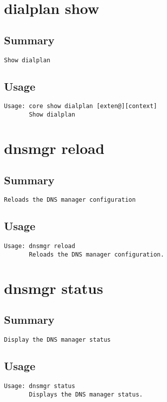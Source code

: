 \section{dialplan show}
\subsection{Summary}
\begin{verbatim}
Show dialplan
\end{verbatim}
\subsection{Usage}
\begin{verbatim}
Usage: core show dialplan [exten@][context]
       Show dialplan

\end{verbatim}


\section{dnsmgr reload}
\subsection{Summary}
\begin{verbatim}
Reloads the DNS manager configuration
\end{verbatim}
\subsection{Usage}
\begin{verbatim}
Usage: dnsmgr reload
       Reloads the DNS manager configuration.

\end{verbatim}


\section{dnsmgr status}
\subsection{Summary}
\begin{verbatim}
Display the DNS manager status
\end{verbatim}
\subsection{Usage}
\begin{verbatim}
Usage: dnsmgr status
       Displays the DNS manager status.

\end{verbatim}


